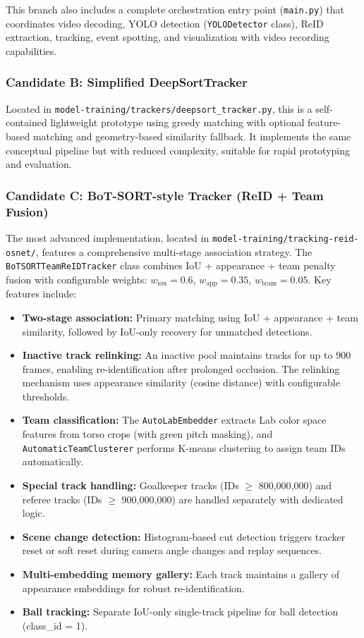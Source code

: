 \documentclass[10pt,twocolumn,a4paper]{article}
\begin{document}
This branch also includes a complete orchestration entry point (\texttt{main.py}) that coordinates video decoding, YOLO detection (\texttt{YOLODetector} class), ReID extraction, tracking, event spotting, and visualization with video recording capabilities.

\subsubsection{Candidate B: Simplified DeepSortTracker}
Located in \texttt{model-training/trackers/deepsort\_tracker.py}, this is a self-contained lightweight prototype using greedy matching with optional feature-based matching and geometry-based similarity fallback. It implements the same conceptual pipeline but with reduced complexity, suitable for rapid prototyping and evaluation.

\subsubsection{Candidate C: BoT-SORT-style Tracker (ReID + Team Fusion)}
The most advanced implementation, located in \texttt{model-training/tracking-reid-osnet/}, features a comprehensive multi-stage association strategy. The \texttt{BoTSORTTeamReIDTracker} class combines IoU + appearance + team penalty fusion with configurable weights: $w_{\text{iou}} = 0.6$, $w_{\text{app}} = 0.35$, $w_{\text{team}} = 0.05$. Key features include:

\begin{itemize}[noitemsep,topsep=0pt]
  \item \textbf{Two-stage association:} Primary matching using IoU + appearance + team similarity, followed by IoU-only recovery for unmatched detections.
  \item \textbf{Inactive track relinking:} An inactive pool maintains tracks for up to 900 frames, enabling re-identification after prolonged occlusion. The relinking mechanism uses appearance similarity (cosine distance) with configurable thresholds.
  \item \textbf{Team classification:} The \texttt{AutoLabEmbedder} extracts Lab color space features from torso crops (with green pitch masking), and \texttt{AutomaticTeamClusterer} performs K-means clustering to assign team IDs automatically.
  \item \textbf{Special track handling:} Goalkeeper tracks (IDs $\geq$ 800,000,000) and referee tracks (IDs $\geq$ 900,000,000) are handled separately with dedicated logic.
  \item \textbf{Scene change detection:} Histogram-based cut detection triggers tracker reset or soft reset during camera angle changes and replay sequences.
  \item \textbf{Multi-embedding memory gallery:} Each track maintains a gallery of appearance embeddings for robust re-identification.
  \item \textbf{Ball tracking:} Separate IoU-only single-track pipeline for ball detection (class\_id = 1).
\end{itemize}
\end{document}
